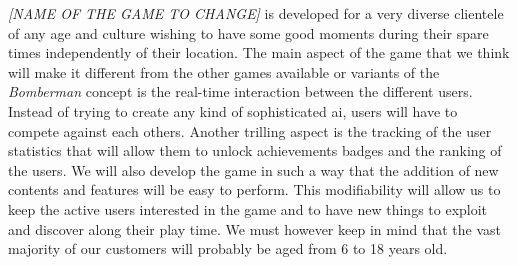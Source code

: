 \textit{[NAME OF THE GAME TO CHANGE]} is developed for a very diverse clientele of any age and culture wishing to have some good moments during their spare times independently of their location. The main aspect of the game that we think will make it different from the other games available or variants of the \textit{Bomberman} concept is the real-time interaction between the different users. Instead of trying to create any kind of sophisticated \gls{ai}, users will have to compete against each others. Another trilling aspect is the tracking of the user statistics that will allow them to unlock achievements badges and the ranking of the users. We will also develop the game in such a way that the addition of new contents and features will be easy to perform. This modifiability will allow us to keep the active users interested in the game and to have new things to exploit and discover along their play time. We must however keep in mind that the vast majority of our customers will probably be aged from 6 to 18 years old. 
